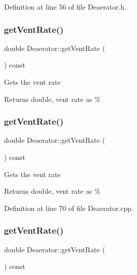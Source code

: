 Definition at line 56 of file Deaerator.\+h.

\mbox{\label{class_deaerator_ad0262491c2bd9a6f820eaaba54498bcd}} 
\subsubsection{\texorpdfstring{get\+Vent\+Rate()}{getVentRate()}\hspace{0.1cm}{\footnotesize\ttfamily [1/3]}}
{\footnotesize\ttfamily double Deaerator\+::get\+Vent\+Rate (\begin{DoxyParamCaption}{ }\end{DoxyParamCaption}) const}

Gets the vent rate \begin{DoxyReturn}{Returns}
double, vent rate as \% 
\end{DoxyReturn}
\mbox{\label{class_deaerator_ad0262491c2bd9a6f820eaaba54498bcd}} 
\subsubsection{\texorpdfstring{get\+Vent\+Rate()}{getVentRate()}\hspace{0.1cm}{\footnotesize\ttfamily [2/3]}}
{\footnotesize\ttfamily double Deaerator\+::get\+Vent\+Rate (\begin{DoxyParamCaption}{ }\end{DoxyParamCaption}) const}

Gets the vent rate \begin{DoxyReturn}{Returns}
double, vent rate as \% 
\end{DoxyReturn}


Definition at line 70 of file Deaerator.\+cpp.

\mbox{\label{class_deaerator_ad0262491c2bd9a6f820eaaba54498bcd}} 
\subsubsection{\texorpdfstring{get\+Vent\+Rate()}{getVentRate()}\hspace{0.1cm}{\footnotesize\ttfamily [3/3]}}
{\footnotesize\ttfamily double Deaerator\+::get\+Vent\+Rate (\begin{DoxyParamCaption}{ }\end{DoxyParamCaption}) const}

